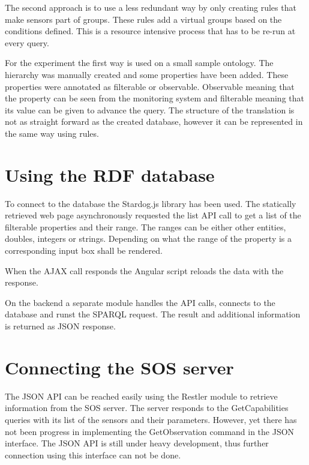 The second approach is to use a less redundant way by only creating rules that make sensors part of groups. These rules add a virtual groups based on the conditions defined. This is a resource intensive process that has to be re-run at every query. 

For the experiment the first way is used on a small sample ontology. The hierarchy was manually created and some properties have been added. These properties were annotated as filterable or observable. Observable meaning that the property can be seen from the monitoring system and filterable meaning that its value can be given to advance the query. The structure of the translation is not as straight forward as the created database, however it can be represented in the same way using rules. 

\section{Using the RDF database}

To connect to the database the Stardog.js library has been used. The statically retrieved web page asynchronously requested the list API call to get a list of the filterable properties and their range. The ranges can be either other entities, doubles, integers or strings. Depending on what the range of the property is a corresponding input box shall be rendered.

When the AJAX call responds the Angular script reloads the data with the response. 

On the backend a separate module handles the API calls, connects to the database and runst the SPARQL request. The result and additional information is returned as JSON response.


\section{Connecting the SOS server}

The JSON API can be reached easily using the Restler module to retrieve information from the SOS server. The server responds to the GetCapabilities queries with its list of the sensors and their parameters. However, yet there has not been progress in implementing the GetObservation command in the JSON interface. The JSON API is still under heavy development, thus further connection using this interface can not be done.

